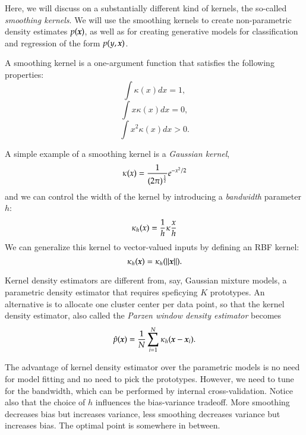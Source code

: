 \begin{refsection}
Here, we will discuss on a substantially different kind of kernels, the so-called {\em smoothing kernels}. We will use the smoothing kernels to create non-parametric density estimates $p(\boldsymbol{x})$, as well as for creating generative models for classification and regression of the form $p(y,\boldsymbol{x})$.

A smoothing kernel is a one-argument function that satisfies the following properties:
$$ \int \kappa(x)dx = 1, $$
$$ \int x\kappa(x)dx = 0, $$
$$ \int x^2\kappa(x)dx > 0. $$

A simple example of a smoothing kernel is a {\em Gaussian kernel},
$$ \kappa(x)={1\over (2\pi)^{1\over 2}} e^{-x^2/2} $$
and we can control the width of the kernel by introducing a {\em bandwidth} parameter $h$:
$$ \kappa_h(x)={1\over h}\kappa{x\over h} $$
We can generalize this kernel to vector-valued inputs by defining an RBF kernel:
$$ \kappa_h(\boldsymbol{x}) = \kappa_h(\left\lVert\boldsymbol{x}\right\rVert).$$

Kernel density estimators are different from, say, Gaussian mixture models, a parametric density estimator that requires speficying $K$ prototypes. An alternative is to allocate one cluster center per data point, so that the kernel density estimator, also called the {\em Parzen window density estimator} becomes
$$ \hat{p}(\boldsymbol{x}) = {1\over N}\sum_{i=1}^N \kappa_h(\boldsymbol{x}-\boldsymbol{x}_i).$$

The advantage of kernel density estimator over the parametric models is no need for model fitting and no need to pick the prototypes. However, we need to tune for the bandwidth, which can be performed by internal cross-validation. Notice also that the choice of $h$ influences the bias-variance tradeoff. More smoothing decreases bias but increases variance, less smoothing decreases variance but increases bias. The optimal point is somewhere in between. 



\printbibliography[heading=subbibliography]
\end{refsection}


